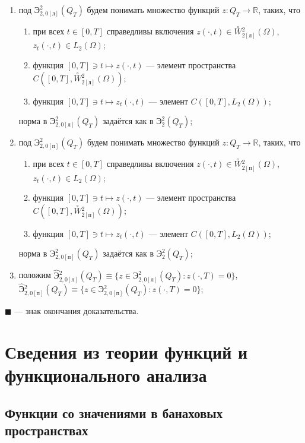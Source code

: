 \documentclass{report}
\begin{document}
{\begin{enumerate}
    \item
под $\textbf{Э}^2_{2,0[\textrm{л}]}(Q_T)$ будем понимать множество функций $z:Q_T\to\mathbb{R}$, таких, что
\begin{enumerate}
    \item
при всех $t\in[0,T]$ справедливы включения $z(\cdot,t)\in\stackrel{\circ}{W}\!\!^2_{2[\textrm{л}]}(\Omega)$, $z_t(\cdot,t)\in L_2(\Omega)$;
    \item
функция $[0,T]\ni t\mapsto z(\cdot,t)$ --- элемент пространства $C([0,T],\stackrel{\circ}{W}\!\!^2_{2[\textrm{л}]}(\Omega))$;
    \item
функция  $[0,T]\ni t\mapsto z_t(\cdot,t)$ --- элемент $C([0,T],L_2(\Omega))$;
\end{enumerate}
норма в  $\textbf{Э}^2_{2,0[\textrm{л}]}(Q_T)$ задаётся как в $\textbf{Э}^2_{2}(Q_T)$;

    \item
под $\textbf{Э}^2_{2,0[\textrm{п}]}(Q_T)$ будем понимать множество функций $z:Q_T\to\mathbb{R}$, таких, что
\begin{enumerate}
    \item
при всех $t\in[0,T]$ справедливы включения $z(\cdot,t)\in\stackrel{\circ}{W}\!\!^2_{2[\textrm{п}]}(\Omega)$, $z_t(\cdot,t)\in L_2(\Omega)$;
    \item
функция $[0,T]\ni t\mapsto z(\cdot,t)$ --- элемент пространства $C([0,T],\stackrel{\circ}{W}\!\!^2_{2[\textrm{п}]}(\Omega))$;
    \item
функция  $[0,T]\ni t\mapsto z_t(\cdot,t)$ --- элемент $C([0,T],L_2(\Omega))$;
\end{enumerate}
норма в  $\textbf{Э}^2_{2,0[\textrm{п}]}(Q_T)$ задаётся как в $\textbf{Э}^2_{2}(Q_T)$;

    \item
положим $\hat{\textbf{Э}}{}^{2}_{2,0[\textrm{л}]}(Q_T)\equiv\{z\in {\textbf{Э}}{}^{2}_{2,0[\textrm{л}]}(Q_T):z(\cdot,T)=0\}$,
$\hat{\textbf{Э}}{}^{2}_{2,0[\textrm{п}]}(Q_T)\equiv\{z\in {\textbf{Э}}{}^{2}_{2,0[\textrm{п}]}(Q_T):z(\cdot,T)=0\}$;

\end{enumerate}}



$\blacksquare$ --- знак окончания доказательства.

\part{Сведения из теории функций и функционального анализа}
    \chapter{Функции со значениями в банаховых пространствах}
\end{document}
